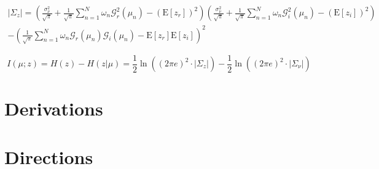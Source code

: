 \documentclass{article}         %
\theoremstyle{definition}
\theoremstyle{remark}
\newcommand{\Gscript}{\mathcal{G}}
\newcommand{\paren}[1]{\left(#1\right)}
\newcommand{\expect}[1]{\mathrm{E}\left[#1\right]}
\begin{document}
\begin{multline}
	\lvert\Sigma_z\rvert = \paren{\frac{\sigma_\nu^2}{\sqrt{\pi}}+\frac{1}{\sqrt{\pi}}\sum_{n=1}^N\omega_n\Gscript_r^2\paren{\mu_n}-\paren{\expect{z_r}}^2}\paren{\frac{\sigma_\nu^2}{\sqrt{\pi}}+\frac{1}{\sqrt{\pi}}\sum_{n=1}^N\omega_n\Gscript_i^2\paren{\mu_n}-\paren{\expect{z_i}}^2}\\
	-\paren{\frac{1}{\sqrt{\pi}}\sum_{n=1}^N\omega_n\Gscript_r\paren{\mu_n}\Gscript_i\paren{\mu_n}-\expect{z_r}\expect{z_i}}^2
\end{multline}

\begin{equation}
	I\left(\mu;z\right) = H\left(z\right) - H\left(z|\mu\right) 
	= \frac{1}{2}\ln\left(\left(2\pi e\right)^2\cdot\lvert\Sigma_z\rvert\right) - \frac{1}{2}\ln\left(\left(2\pi e\right)^2\cdot\lvert\Sigma_\nu\rvert\right)
\end{equation}

\section{Derivations}\label{Derivations}



\section{Directions}\label{Directions}
\end{document}
